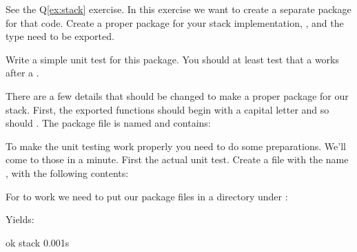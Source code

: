 \begin{Exercise}[title={Stack as package},difficulty=0]
\label{ex:stack-package}
\Question\label{ex:stack-package q1} 
See the Q\ref{ex:stack} exercise. In this exercise we want to create
a separate package for that code.
Create a proper package for your
stack implementation, ,  and the  type need to be
exported.

\Question\label{ex:stack-package q2} Write a simple unit test for this package.
You should at least test that a  works after a .

\end{Exercise}

\begin{Answer}
\Question There are a few details that should be changed to make a proper package
for our stack. First, the exported functions should begin with a capital 
letter and so should . The package file is named 
and contains:


\Question To make the unit testing work properly you need to do some
preparations. We'll come to those in a minute. First the actual unit test.
Create a file with the name , with the following contents:


For  to work we need to put our package files in a directory
under :\\

\begin{display}
\pr {}
\pr {}
\pr {}
\end{display}

Yields:\\

\begin{display}
\pr {}
ok      stack   0.001s
\end{display}

\end{Answer}
